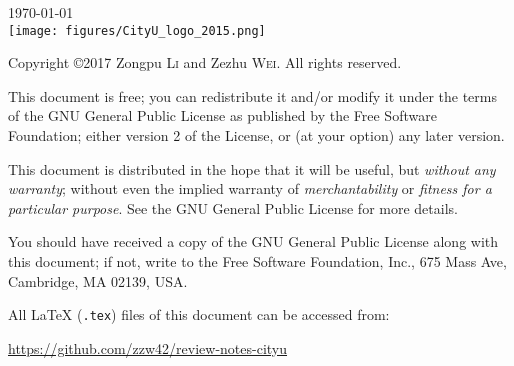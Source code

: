 \documentclass[UTF8,a4paper,10pt,openany]{book}
\theoremstyle{plain}
\theoremstyle{definition}
\begin{document}
\begin{titlepage}



{\large \today}\\[2cm] %

\vspace{5cm}
\texttt{[image: figures/CityU\_logo\_2015.png]}\\[1cm] %
 

\vfill %
\end{titlepage}

\noindent
Copyright \copyright 2017 Zongpu \textsc{Li} and Zezhu \textsc{Wei}. All rights reserved.

This document is free; you can redistribute it and/or modify it under the terms of the GNU General Public License as published by the Free Software Foundation; either version 2 of the License, or (at your option) any later version.

This document is distributed in the hope that it will be useful, but \emph{without any warranty}; without even the implied warranty of \emph{merchantability} or \emph{fitness for a particular purpose}. See the GNU General Public License for more details.

You should have received a copy of the GNU General Public License along with this document; if not, write to the Free Software Foundation, Inc., 675 Mass Ave, Cambridge, MA 02139, USA.

All \LaTeX{} (\texttt{.tex}) files of this document can be accessed from:

\url{https://github.com/zzw42/review-notes-cityu}

\tableofcontents
\listoffigures
\end{document}
